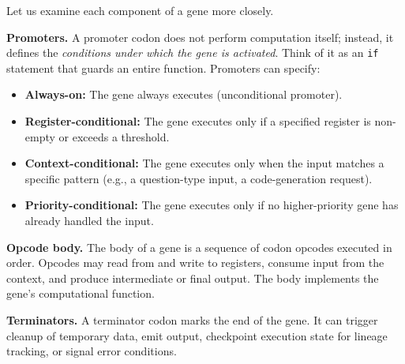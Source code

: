 Let us examine each component of a gene more closely.

\medskip
\noindent\textbf{Promoters.}
A promoter codon does not perform computation itself; instead, it defines the \emph{conditions under which the gene is activated}. Think of it as an \texttt{if} statement that guards an entire function. Promoters can specify:
\begin{itemize}[leftmargin=1.8em]
  \item \textbf{Always-on:} The gene always executes (unconditional promoter).
  \item \textbf{Register-conditional:} The gene executes only if a specified register is non-empty or exceeds a threshold.
  \item \textbf{Context-conditional:} The gene executes only when the input matches a specific pattern (e.g., a question-type input, a code-generation request).
  \item \textbf{Priority-conditional:} The gene executes only if no higher-priority gene has already handled the input.
\end{itemize}

\noindent\textbf{Opcode body.}
The body of a gene is a sequence of codon opcodes executed in order. Opcodes may read from and write to registers, consume input from the context, and produce intermediate or final output. The body implements the gene's computational function.

\noindent\textbf{Terminators.}
A terminator codon marks the end of the gene. It can trigger cleanup of temporary data, emit output, checkpoint execution state for lineage tracking, or signal error conditions.

